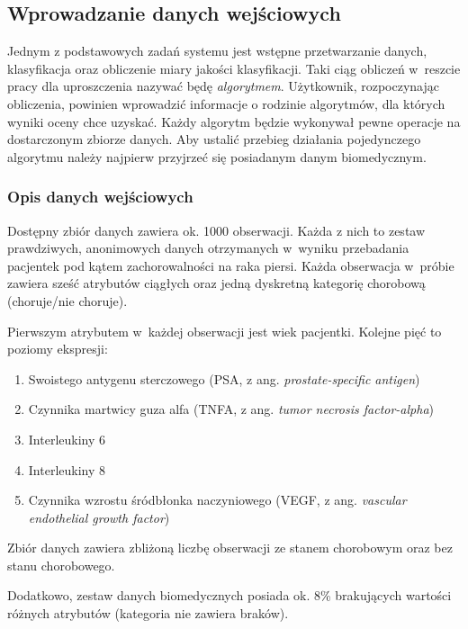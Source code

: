 \documentclass[../thesis.tex]{subfiles}
\begin{document}
\subsection{Wprowadzanie danych wejściowych}
\label{req:input}

Jednym z podstawowych zadań systemu jest wstępne przetwarzanie danych, klasyfikacja oraz obliczenie miary jakości klasyfikacji. Taki ciąg obliczeń w~reszcie pracy dla uproszczenia nazywać będę \emph{algorytmem}. Użytkownik, rozpoczynając obliczenia, powinien wprowadzić informacje o rodzinie algorytmów, dla których wyniki oceny chce uzyskać. Każdy algorytm będzie wykonywał pewne operacje na dostarczonym zbiorze danych. Aby ustalić przebieg działania pojedynczego algorytmu należy najpierw przyjrzeć się posiadanym danym biomedycznym.

\subsubsection{Opis danych wejściowych}

Dostępny zbiór danych zawiera ok. 1000 obserwacji. Każda z nich to zestaw prawdziwych, anonimowych danych otrzymanych w~wyniku przebadania pacjentek pod kątem zachorowalności na raka piersi. Każda obserwacja w~próbie zawiera sześć atrybutów ciągłych oraz jedną dyskretną kategorię chorobową (choruje/nie choruje). 

Pierwszym atrybutem w~każdej obserwacji jest wiek pacjentki. Kolejne pięć to poziomy ekspresji:
\begin{enumerate}
  \item Swoistego antygenu sterczowego (PSA, z ang. \emph{prostate-specific antigen})
  \item Czynnika martwicy guza alfa (TNFA, z ang. \emph{tumor necrosis factor-alpha})
  \item Interleukiny 6
  \item Interleukiny 8
  \item Czynnika wzrostu śródbłonka naczyniowego (VEGF, z ang. \emph{vascular endothelial growth factor})
\end{enumerate}
Zbiór danych zawiera zbliżoną liczbę obserwacji ze stanem chorobowym oraz bez stanu chorobowego.

Dodatkowo, zestaw danych biomedycznych posiada ok. 8\% brakujących wartości różnych atrybutów (kategoria nie zawiera braków).
\end{document}
